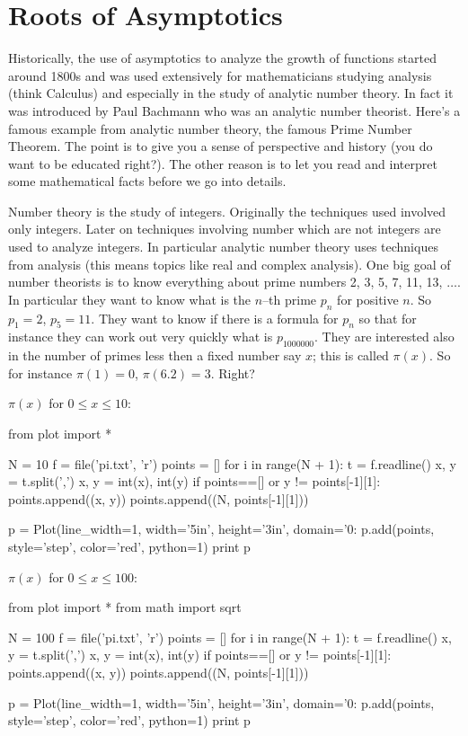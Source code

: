 \section{Roots of Asymptotics}

Historically, the use of asymptotics to analyze the
growth of functions started around 1800s and was used extensively
for mathematicians studying analysis (think Calculus) and
especially in the study of analytic number theory. In fact it was
introduced by Paul Bachmann who was an analytic number theorist.
Here's a famous example from analytic number theory, the famous
Prime Number Theorem. The point is to give you a sense of
perspective and history (you do want to be educated right?). The
other reason is to let you read and interpret some mathematical
facts before we go into details.

Number theory is the study of integers. Originally the techniques
used involved only integers. Later on techniques involving number
which are not integers are used to analyze integers. In particular
analytic number theory uses techniques from analysis (this means
topics like real and complex analysis). One big goal of number
theorists is to know everything about prime numbers 2, 3, 5, 7,
11, 13, $\ldots$. In particular they want to know what is the
$n$--th prime $p_n$ for positive $n$. So $p_1 = 2$, $p_5 = 11$.
They want to know if there is a formula for $p_n$ so that for
instance they can work out very quickly what is $p_{1000000}$.
They are interested also in the number of primes less then a fixed
number say $x$; this is called $\pi(x)$. So for instance $\pi(1) =
0$, $\pi(6.2) = 3$. Right? 


$\pi(x)$ for $0 \leq x \leq 10$:
\begin{python}
from plot import *

N = 10
f = file('pi.txt', 'r')
points = []
for i in range(N + 1):
    t = f.readline()
    x, y = t.split(',')
    x, y = int(x), int(y)
    if points==[] or y != points[-1][1]:
        points.append((x, y))
points.append((N, points[-1][1]))

p = Plot(line_width=1, width='5in', height='3in', domain='0:%
p.add(points, style='step', color='red', python=1)
print p
\end{python}


$\pi(x)$ for $0 \leq x \leq 100$:
\begin{python}
from plot import *
from math import sqrt

N = 100
f = file('pi.txt', 'r')
points = []
for i in range(N + 1):
    t = f.readline()
    x, y = t.split(',')
    x, y = int(x), int(y)
    if points==[] or y != points[-1][1]:
        points.append((x, y))
points.append((N, points[-1][1]))

p = Plot(line_width=1, width='5in', height='3in', domain='0:%
p.add(points, style='step', color='red', python=1)
print p
\end{python}



